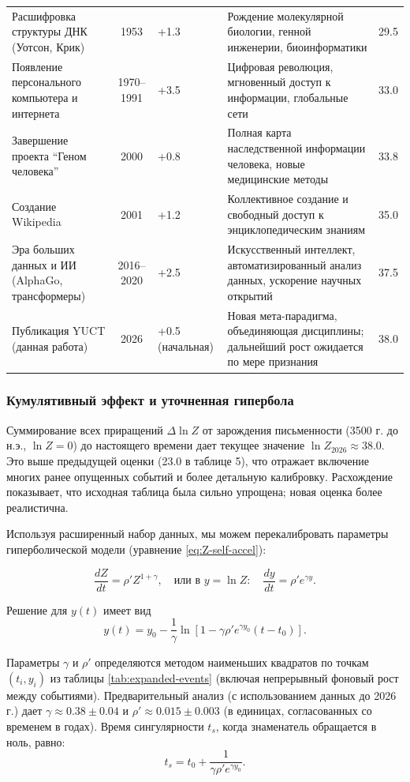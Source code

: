 \documentclass[12pt,a4paper]{article}
\theoremstyle{remark}
\begin{document}
\begin{table}[htbp]
\begin{tabular}{p{3.2cm} c p{2.5cm} p{4.5cm} c}
			Расшифровка структуры ДНК (Уотсон, Крик) & 1953 & +1.3 & Рождение молекулярной биологии, генной инженерии, биоинформатики & 29.5 \\
			Появление персонального компьютера и интернета & 1970–1991 & +3.5 & Цифровая революция, мгновенный доступ к информации, глобальные сети & 33.0 \\
			Завершение проекта ``Геном человека'' & 2000 & +0.8 & Полная карта наследственной информации человека, новые медицинские методы & 33.8 \\
			Создание Wikipedia & 2001 & +1.2 & Коллективное создание и свободный доступ к энциклопедическим знаниям & 35.0 \\
			Эра больших данных и ИИ (AlphaGo, трансформеры) & 2016–2020 & +2.5 & Искусственный интеллект, автоматизированный анализ данных, ускорение научных открытий & 37.5 \\
			Публикация YUCT (данная работа) & 2026 & +0.5 (начальная) & Новая мета-парадигма, объединяющая дисциплины; дальнейший рост ожидается по мере признания & 38.0 \\
			\bottomrule
		\end{tabular}
	\end{table}
	
	\subsubsection{Кумулятивный эффект и уточненная гипербола}
	
	Суммирование всех приращений $\Delta \ln Z$ от зарождения письменности (3500 г. до н.э., $\ln Z=0$) до настоящего времени дает текущее значение $\ln Z_{2026} \approx 38.0$. Это выше предыдущей оценки (23.0 в таблице 5), что отражает включение многих ранее опущенных событий и более детальную калибровку. Расхождение показывает, что исходная таблица была сильно упрощена; новая оценка более реалистична.
	
	Используя расширенный набор данных, мы можем перекалибровать параметры гиперболической модели (уравнение \eqref{eq:Z-self-accel}):
	
	\[
	\frac{dZ}{dt} = \rho' Z^{1+\gamma}, \quad \text{или в } y = \ln Z: \quad \frac{dy}{dt} = \rho' e^{\gamma y}.
	\]
	
	Решение для $y(t)$ имеет вид
	\[
	y(t) = y_0 - \frac{1}{\gamma} \ln\left[1 - \gamma \rho' e^{\gamma y_0} (t - t_0)\right].
	\]
	
	Параметры $\gamma$ и $\rho'$ определяются методом наименьших квадратов по точкам $(t_i, y_i)$ из таблицы \ref{tab:expanded-events} (включая непрерывный фоновый рост между событиями). Предварительный анализ (с использованием данных до 2026 г.) дает $\gamma \approx 0.38 \pm 0.04$ и $\rho' \approx 0.015 \pm 0.003$ (в единицах, согласованных со временем в годах). Время сингулярности $t_s$, когда знаменатель обращается в ноль, равно:
	\[
	t_s = t_0 + \frac{1}{\gamma \rho' e^{\gamma y_0}}.
	\]
	
\end{document}

